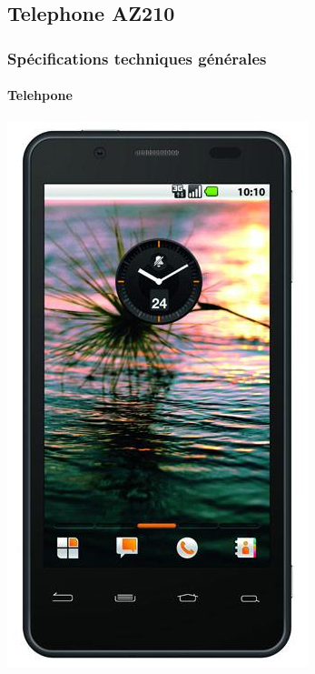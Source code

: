 \documentclass[transparent]{beamer}
\begin{document}
\subsection{Telephone AZ210}

\begin{frame}
	\frametitle{Spécifications techniques générales}
	\framesubtitle{Telehpone}
	\begin{center}
 	\includegraphics[height=0.8\textheight]{images/telephone.png} 
	\end{center}

\end{frame}
\end{document}
